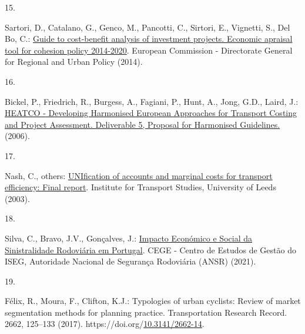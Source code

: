 \documentclass[runningheads]{llncs}
\newlength{\cslhangindent}
\newlength{\csllabelwidth}
\newlength{\cslentryspacingunit} %
\newenvironment{CSLReferences}[2] %
 {%
  \setlength{\parindent}{0pt}
  \ifodd #1
  \let\oldpar\par
  \def\par{\hangindent=\cslhangindent\oldpar}
  \fi
  \setlength{\parskip}{#2\cslentryspacingunit}
 }%
 {}
\newcommand{\CSLLeftMargin}[1]{\parbox[t]{\csllabelwidth}{#1}}
\newcommand{\CSLRightInline}[1]{\parbox[t]{\linewidth - \csllabelwidth}{#1}\break}
\begin{document}
\begin{CSLReferences}{0}{0}
\leavevmode{}%
\CSLLeftMargin{15. }%
\CSLRightInline{Sartori, D., Catalano, G., Genco, M., Pancotti, C.,
Sirtori, E., Vignetti, S., Del Bo, C.:
\href{https://ec.europa.eu/regional_policy/sources/docgener/studies/pdf/cba_guide.pdf}{Guide
to cost-benefit analysis of investment projects. Economic apraisal tool
for cohesion policy 2014-2020}. {European Commission - Directorate
General for Regional and Urban Policy} (2014).}

\leavevmode{}%
\CSLLeftMargin{16. }%
\CSLRightInline{Bickel, P., Friedrich, R., Burgess, A., Fagiani, P.,
Hunt, A., Jong, G.D., Laird, J.:
\href{https://trimis.ec.europa.eu/sites/default/files/project/documents/20130122_113653_88902_HEATCO_D5_summary.pdf}{{HEATCO
- Developing Harmonised European Approaches for Transport Costing and
Project Assessment. Deliverable 5, Proposal for Harmonised Guidelines.}}
(2006).}

\leavevmode{}%
\CSLLeftMargin{17. }%
\CSLRightInline{Nash, C., others:
\href{https://www.its.leeds.ac.uk/projects/unite/downloads/Unite\%20Final\%20Report.pdf}{UNIfication
of accounts and marginal costs for transport efficiency: Final report}.
{Institute for Transport Studies, University of Leeds} (2003).}

\leavevmode{}%
\CSLLeftMargin{18. }%
\CSLRightInline{Silva, C., Bravo, J.V., Gonçalves, J.:
\href{http://www.ansr.pt/Estatisticas/RelatoriosTematicos/Documents/O\%20Impacto\%20Economico\%20e\%20Social\%20da\%20Sinistralidade\%20-\%20PT.pdf}{{Impacto
Económico e Social da Sinistralidade Rodoviária em Portugal}}. {CEGE -
Centro de Estudos de Gestão do ISEG, Autoridade Nacional de Segurança
Rodoviária (ANSR)} (2021).}

\leavevmode{}%
\CSLLeftMargin{19. }%
\CSLRightInline{Félix, R., Moura, F., Clifton, K.J.: Typologies of urban
cyclists: Review of market segmentation methods for planning practice.
Transportation Research Record. 2662, 125--133 (2017).
https://doi.org/\href{https://doi.org/10.3141/2662-14}{10.3141/2662-14}.}

\end{CSLReferences}

%
\end{document}
